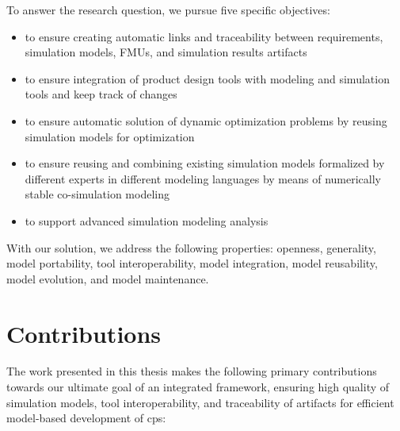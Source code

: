 To answer the research question, we pursue five specific objectives: 
\begin{itemize}

 \item to ensure creating automatic links and traceability between requirements, simulation models, FMUs, and simulation results artifacts 
 \item to ensure integration of product design tools with modeling and simulation tools and keep track of changes
 \item to ensure automatic solution of dynamic optimization problems by reusing simulation models for optimization 
 \item to ensure reusing and combining existing simulation models formalized by different experts in different modeling languages by means of numerically stable co-simulation modeling 
 \item to support advanced simulation modeling analysis 

\end{itemize}

With our solution, we address the following properties: openness, generality, model portability, tool interoperability, model integration, model reusability, model evolution, and model maintenance.

\section{Contributions}
\label{sec:Contributions}

The work presented in this thesis makes the following primary contributions towards our ultimate goal of an integrated framework, ensuring high quality of simulation models, tool interoperability, and traceability of artifacts for efficient model-based development of \acrshort{cps}:

